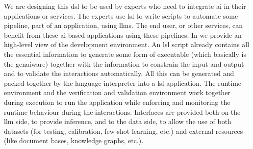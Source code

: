 \documentclass[manuscript,screen]{acmart}
\begin{document}
We are designing this \ac{dsl} to be used by experts who need to integrate \ac{ai} in their applications or services.
The experts use \ac{lsl} to write scripts to automate some pipeline, part of an application, using \acp{llm}.
The end user, or other services, can benefit from these \ac{ai}-based applications using these pipelines. 
In  we provide an high-level view of the development environment.
An \ac{lsl} script already contains all the essential information to generate some form of executable (which basically is the \ac{genai}ware) together with the information to constrain the input and output and to validate the interactions automatically.
All this can be generated and packed together by the language interpreter into a \ac{lsl} application.
The runtime environment and the verification and validation environment work together during execution to run the application while enforcing and monitoring the runtime behaviour during the interactions.
Interfaces are provided both on the \ac{llm} side, to provide inference, and to the data side, to allow the use of both datasets (for testing, calibration, few-shot learning, etc.) and external resources (like document bases, knowledge graphs, etc.).
\end{document}
